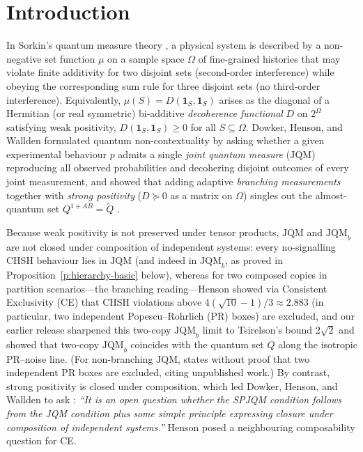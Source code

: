 \documentclass[11pt,a4paper]{article}
\theoremstyle{definition}
\theoremstyle{remark}
\newcommand{\ind}[1]{\mathbf{1}_{#1}}
\newcommand{\JQM}{\mathrm{JQM}}
\newcommand{\JQMb}{\mathrm{JQM}_b}
\newcommand{\QAB}{Q^{1+AB}}
\begin{document}
\section{Introduction}

In Sorkin's quantum measure theory \cite{Sorkin}, a physical system is described by a non-negative set function $\mu$ on a sample space $\Omega$ of fine-grained histories that may violate finite additivity for two disjoint sets (second-order interference) while obeying the corresponding sum rule for three disjoint sets (no third-order interference). Equivalently, $\mu(S) = D(\ind S, \ind S)$ arises as the diagonal of a Hermitian (or real symmetric) bi-additive \emph{decoherence functional} $D$ on $2^\Omega$ satisfying weak positivity, $D(\ind S, \ind S) \ge 0$ for all $S \subseteq \Omega$. Dowker, Henson, and Wallden \cite{DHW} formulated quantum non-contextuality by asking whether a given experimental behaviour $p$ admits a single \emph{joint quantum measure} ($\JQM$) reproducing all observed probabilities and decohering disjoint outcomes of every joint measurement, and showed that adding adaptive \emph{branching measurements} together with \emph{strong positivity} ($D \succeq 0$ as a matrix on $\Omega$) singles out the almost-quantum set $\QAB = \tilde{Q}$ \cite{DHW,NGHA}.

Because weak positivity is not preserved under tensor products, $\JQM$ and $\JQMb$ are not closed under composition of independent systems: every no-signalling CHSH behaviour lies in $\JQM$ \cite[Sec.~5]{DHW} (and indeed in $\JQMb$, as proved in Proposition~\ref{p:hierarchy-basic} below), whereas for two composed copies in partition scenarios---the branching reading---Henson \cite{Henson} showed via Consistent Exclusivity (CE) that CHSH violations above $4(\sqrt{10}-1)/3 \approx 2.883$ (in particular, two independent Popescu--Rohrlich (PR) boxes) are excluded, and our earlier release \cite{TwoCopy} sharpened this two-copy $\JQMb$ limit to Tsirelson's bound $2\sqrt{2}$ and showed that two-copy $\JQMb$ coincides with the quantum set $Q$ along the isotropic PR--noise line. (For non-branching $\JQM$, \cite[Sec.~5]{DHW} states without proof that two independent PR boxes are excluded, citing unpublished work.) By contrast, strong positivity is closed under composition, which led Dowker, Henson, and Wallden to ask \cite[Sec.~4]{DHW}: \emph{``It is an open question whether the SPJQM condition follows from the JQM condition plus some simple principle expressing closure under composition of independent systems.''} Henson \cite{Henson} posed a neighbouring composability question for CE.
\end{document}
